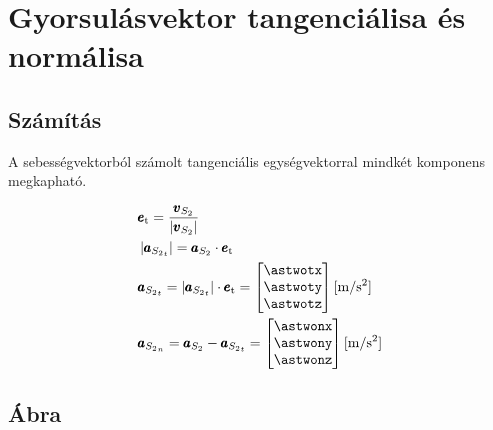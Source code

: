 \section{Gyorsulásvektor tangenciálisa és normálisa}

\subsection{Számítás}

A sebességvektorból számolt tangenciális egységvektorral mindkét komponens megkapható.

\begin{align}
	&\pmb{e}_\text{t} = 
	\frac{\pmb{v}_{S_2}}{\left|\pmb{v}_{S_2}\right|} \\
	&\left| \pmb{a}_{{S_2}_t} \right| = 
	\pmb{a}_{S_2} \cdot \pmb{e}_\text{t} \\
	&\pmb{a}_{{S_2}_t} = 
	\left|\pmb{a}_{{S_2}_t}\right| \cdot \pmb{e}_\text{t} = 
	\begin{bmatrix}
		\astwotx \\ \astwoty \\ \astwotz
	\end{bmatrix} \siunit{}{\m\per\second^2} \\
	&\pmb{a}_{{S_2}_n} = \pmb{a}_{{S_2}} - \pmb{a}_{{S_2}_t} =
	\begin{bmatrix}
		\astwonx \\ \astwony \\ \astwonz
	\end{bmatrix} \siunit{}{\m\per\second^2}
\end{align}

\subsection{Ábra}
\structuretangential
